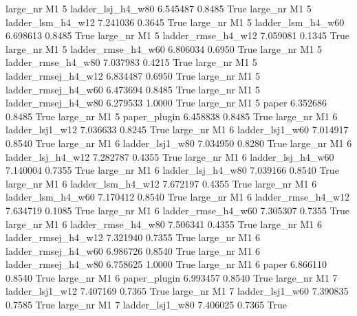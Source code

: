  large_nr       M1                 5   ladder_lsj_h4_w80   6.545487      0.8485    True
  large_nr       M1                 5   ladder_lsm_h4_w12   7.241036      0.3645    True
  large_nr       M1                 5   ladder_lsm_h4_w60   6.698613      0.8485    True
  large_nr       M1                 5  ladder_rmse_h4_w12   7.059081      0.1345    True
  large_nr       M1                 5  ladder_rmse_h4_w60   6.806034      0.6950    True
  large_nr       M1                 5  ladder_rmse_h4_w80   7.037983      0.4215    True
  large_nr       M1                 5 ladder_rmsej_h4_w12   6.834487      0.6950    True
  large_nr       M1                 5 ladder_rmsej_h4_w60   6.473694      0.8485    True
  large_nr       M1                 5 ladder_rmsej_h4_w80   6.279533      1.0000    True
  large_nr       M1                 5               paper   6.352686      0.8485    True
  large_nr       M1                 5        paper_plugin   6.458838      0.8485    True
  large_nr       M1                 6     ladder_lsj1_w12   7.036633      0.8245    True
  large_nr       M1                 6     ladder_lsj1_w60   7.014917      0.8540    True
  large_nr       M1                 6     ladder_lsj1_w80   7.034950      0.8280    True
  large_nr       M1                 6   ladder_lsj_h4_w12   7.282787      0.4355    True
  large_nr       M1                 6   ladder_lsj_h4_w60   7.140004      0.7355    True
  large_nr       M1                 6   ladder_lsj_h4_w80   7.039166      0.8540    True
  large_nr       M1                 6   ladder_lsm_h4_w12   7.672197      0.4355    True
  large_nr       M1                 6   ladder_lsm_h4_w60   7.170412      0.8540    True
  large_nr       M1                 6  ladder_rmse_h4_w12   7.634719      0.1085    True
  large_nr       M1                 6  ladder_rmse_h4_w60   7.305307      0.7355    True
  large_nr       M1                 6  ladder_rmse_h4_w80   7.506341      0.4355    True
  large_nr       M1                 6 ladder_rmsej_h4_w12   7.321940      0.7355    True
  large_nr       M1                 6 ladder_rmsej_h4_w60   6.986726      0.8540    True
  large_nr       M1                 6 ladder_rmsej_h4_w80   6.758625      1.0000    True
  large_nr       M1                 6               paper   6.866110      0.8540    True
  large_nr       M1                 6        paper_plugin   6.993457      0.8540    True
  large_nr       M1                 7     ladder_lsj1_w12   7.407169      0.7365    True
  large_nr       M1                 7     ladder_lsj1_w60   7.390835      0.7585    True
  large_nr       M1                 7     ladder_lsj1_w80   7.406025      0.7365    True
